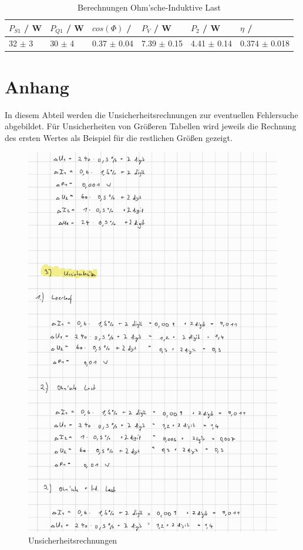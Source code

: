 \documentclass[12pt,a4paper,twoside]{article}
\begin{document}
\begin{table}[H]
    \centering
    \caption{Berechnungen Ohm'sche-Induktive Last}
    \label{tab:BerechnungenOhmIndAW}
    \begin{tabular}{| l | l | l | l | l | l |}
        \hline
        $P_{S1}$ / W & $P_{Q1}$ / W & $cos(\Phi)$ / & $P_{V}$ / W & $P_{2}$ / W & $\eta$ / \\
        \hline
        32 $\pm$ 3 & 30 $\pm$ 4 & 0.37 $\pm$ 0.04 & 7.39 $\pm$ 0.15 & 4.41 $\pm$ 0.14 & 0.374 $\pm$ 0.018 \\
        \hline
    \end{tabular}
\end{table}


\newpage
\section{Anhang}

In diesem Abteil werden die Unsicherheitsrechnungen zur eventuellen Fehlersuche abgebildet. Für Unsicherheiten von Größeren Tabellen wird jeweils die Rechnung des ersten Wertes als Beispiel für die restlichen Größen gezeigt.

\begin{figure}[H]
    \centering
    \includegraphics[width=0.8\linewidth, angle=0]{nudes/Unsicherheiten1.jpg}
    \caption{Unsicherheitsrechnungen}
    \label{fig:Unsicherheitsrechnungen1}
\end{figure}
\end{document}
